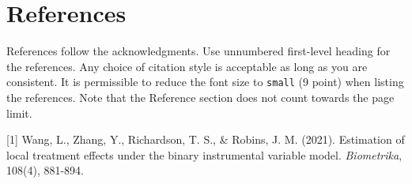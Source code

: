 \documentclass{article}
\begin{document}
\section*{References}

References follow the acknowledgments. Use unnumbered first-level heading for
the references. Any choice of citation style is acceptable as long as you are
consistent. It is permissible to reduce the font size to \verb+small+ (9 point)
when listing the references.
Note that the Reference section does not count towards the page limit.
\medskip

{
\small

[1] Wang, L., Zhang, Y., Richardson, T. S., \& Robins, J. M. (2021). Estimation of local treatment effects under the binary instrumental variable model. {\it Biometrika}, 108(4), 881-894.
}
\end{document}
